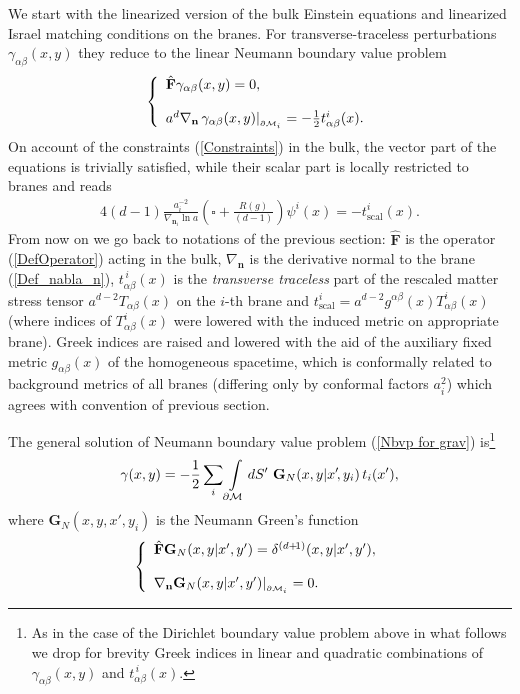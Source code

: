 \documentclass[a4paper,12pt]{article}
\newcommand{\za}{{\alpha}}   %
\newcommand{\zb}{{\beta}}    %
\newcommand{\ddim}{{d}}
\newcommand{\DDim}{{(d+\!1)}}
\newcommand{\dM}{{\partial \cal M}}
\newcommand{\un}{\mathbf n} %
\newcommand{\bBox}{\square}  %
\newcommand{\BBox}{\hat{\mathbf{F}}}  %
\newcommand{\Bnabla}{\nabla}  %
\newcommand{\Bnablan}{\nabla_{\un}}
\newcommand{\GrN}{ \mathbf{G}_{N}}  %
\newcommand{\dS}{dS}
\begin{document}
We start with the linearized version of the bulk Einstein
equations and linearized Israel matching conditions on the branes.
For transverse-traceless perturbations $\gamma_{\alpha\beta}(x,y)$
they reduce to the linear Neumann boundary value problem
    \begin{eqnarray}
     \left\{ \begin{array}{l}
     \BBox \gamma_{\za\zb}(x,y)=0,  \\
     \\
     a^\ddim\Bnablan\,\gamma_{\za\zb}
     (x,y)|_{_{\dM_i}}=
     -\frac12 t_{\alpha\beta}^i(x).\\
     \end{array} \right.                    \label{Nbvp for grav}
    \end{eqnarray}
On account of the constraints (\ref{Constraints}) in the bulk, the
vector part of the equations is trivially satisfied, while their
scalar part is locally restricted to branes and reads
\cite{GarTan}
    \begin{eqnarray}
     4(\ddim-1)\frac{a_i^{-2}}{\Bnabla_{\un_i}\ln{a}}
     \left(\bBox+\frac{R(g)}
     {(\ddim\!-\!1)}\right)\psi^i(x)=
     -t^i_{\mathrm{scal}}(x).              \label{Eq for dilaton}
    \end{eqnarray}
From now on we go back to notations of the previous section:
$\BBox$ is the operator (\ref{DefOperator}) acting in the bulk,
$\Bnablan$ is the derivative normal to the brane
(\ref{Def_nabla_n}), $t_{\za\zb}^{\,i}(x)$ is the {\em transverse
traceless} part of the rescaled matter stress tensor
$a^{\ddim-2}T_{\za\zb}(x)$ on the $i$-th brane and
$t^i_{\mathrm{scal}}= a^{\ddim-2}g^{\za\zb}(x)T_{\za\zb}^i(x)$
(where indices of $T_{\alpha\beta}^i(x)$ were lowered with the
induced metric on appropriate brane). Greek indices are raised and
lowered with the aid of the auxiliary fixed metric $g_{\za\zb}(x)$
of the homogeneous spacetime, which is conformally related to
background metrics of all branes (differing only by conformal
factors $a_i^2$) which agrees with convention of previous section.

The general solution of Neumann boundary value problem (\ref{Nbvp
for grav}) is\footnote{As in the case of the Dirichlet boundary
value problem above in what follows we drop for brevity Greek
indices in linear and quadratic combinations of
$\gamma_{\alpha\beta}(x,y)$ and $t_{\alpha\beta}^{\,i}(x)$.}
    \begin{eqnarray}
     \gamma(x,y)=-\frac12 \sum_i\int
     \limits_{\dM}\dS'\,\,
    \GrN(x,y|x'\!,y_i)\,t_i(x'),      \label{GenSolNbvp}
    \end{eqnarray}
where $\GrN(x,y,x'\!,y_i)$ is the Neumann Green's function
    \begin{eqnarray}
     \left\{ \begin{array}{l}
     \BBox \GrN(x,y|x',y')=\delta^{\DDim}(x,y|x',y'),  \\
    \\
     \Bnablan\GrN(x,y|x',y')|_{_{\dM_i}}=0.
     \end{array} \right.                      \label{Nbvp for GF}
    \end{eqnarray}
\end{document}
